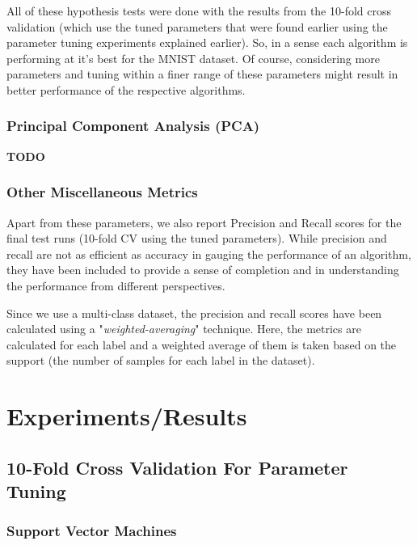 \documentclass[10pt]{scrartcl}
\begin{document}
All of these hypothesis tests were done with the results from the 10-fold cross validation (which use the tuned parameters that were found earlier using the parameter tuning experiments explained earlier). So, in a sense each algorithm is performing at it's best for the MNIST dataset. Of course, considering more parameters and tuning within a finer range of these parameters might result in better performance of the respective algorithms.  

\subsubsection*{Principal Component Analysis (PCA)}
\textbf{TODO} 
 
\subsubsection*{Other Miscellaneous Metrics} 
Apart from these parameters, we also report Precision and Recall scores for the final test runs (10-fold CV using the tuned parameters). While precision and recall are not as efficient as accuracy in gauging the performance of an algorithm, they have been included to provide a sense of completion and in understanding the performance from different perspectives. 

Since we use a multi-class dataset, the precision and recall scores have been calculated using a "\textit{weighted-averaging}" technique. Here, the metrics are calculated for each label and a weighted average of them is taken based on the support (the number of samples for each label in the dataset).


\section*{Experiments/Results} 

\subsection*{10-Fold Cross Validation For Parameter Tuning}

\subsubsection*{Support Vector Machines}
\end{document}
